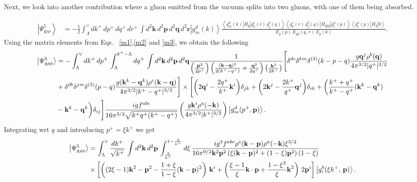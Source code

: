 \documentclass[aps,prd,amsmath,amssymb,nofootinbib]{revtex4-2}
\numberwithin{equation}{section}
\begin{document}
Next, we look into another contribution where a gluon emitted from the vacuum splits into two gluons, with one of them being absorbed.
\begin{figure}[h]
    \label{fig:7}
\end{figure}
\begin{align}\label{grhorhoabs}
\left|\Psi_{g\rho\rho}^{5}\right\rangle & = -\frac{1}{2}\int_{\Lambda}^{\vee}dk^{+}\, dp^{+}\, dq^{+}\, dr^{+}\,\int d^{2}\mathbf{k}\, d^{2}\mathbf{p}\, d^{2}\mathbf{q}\, d^{2}\mathbf{r}\left|g_{m}^{d}(k)\right\rangle \frac{\left\langle g_{m}^{d}(k)\left|H_{g}\right|g_{k}^{c}(r)\, g_{j}^{b}(q)\right\rangle \left\langle g_{k}^{c}(r)\, g_{j}^{b}(q)\left|H_{ggg}\right|g_{i}^{a}(p)\right\rangle \left\langle g_{i}^{a}(p)\left|H_{g}\right|0\right\rangle }{E_{g}(p)\, E_{gg}(q,\, r)\, E_{g}(k)}.
\end{align}
Using the matrix elements from Eqs.~ \eqref{m1},\eqref{m2} and \eqref{m3}, we obtain the following
\begin{align}\label{subsgrhorhoabs}
\left|\Psi_{g\rho\rho}^{5}\right\rangle & =-\int_{\Lambda}^{\vee}dk^{+}\,dp^{+}\,\int_{\Lambda}^{k^{+}-\Lambda}dq^{+}\,\int d^{2}\mathbf{k}\,d^{2}\mathbf{p}\,d^{2}\mathbf{q}\frac{1}{\left(\frac{\mathbf{p}^{2}}{2p^{+}}\right)\left(\frac{(\mathbf{k}-\mathbf{q})^{2}}{2(k^{+}-q^{+})}+\frac{\mathbf{q}^{2}}{2q^{+}}\right)\left(\frac{\mathbf{k}^{2}}{2k^{+}}\right)}\Bigg[\delta^{dc}\delta^{km}\delta^{(3)}(k-p-q)\frac{g\mathbf{q}^{j}\rho^{b}(\mathbf{q})}{4\pi^{3/2}|q^{+}|^{3/2}}\notag \\ & +\delta^{db}\delta^{jm}\delta^{(3)}(p-q)\frac{g(\mathbf{k}^{k}-\mathbf{q}^{k})\rho^{c}(\mathbf{k}-\mathbf{q})}{4\pi^{3/2}|k^{+}-q^{+}|^{3/2}}\Bigg]\times\Bigg[\bigg(2\mathbf{q}^{i}-\frac{2q^{+}}{k^{+}}\mathbf{k}^{i}\bigg)\delta_{jk}+\bigg(2\mathbf{k}^{j}-\frac{2k^{+}}{q^{+}}\mathbf{q}^{j}\bigg)\delta_{ik}+\bigg(\frac{k^{+}+q^{+}}{k^{+}-q^{+}}(\mathbf{k}^{k}-\mathbf{q}^{k})\notag \\ & -\mathbf{k}^{k}-\mathbf{q}^{k}\bigg)\delta_{ij}\Bigg]\frac{igf^{abc}}{16\pi^{3/2}\sqrt{k^{+}q^{+}(k^{+}-q^{+})}}\left(\frac{g\mathbf{k}^{i}\rho^{a}(-\mathbf{k})}{4\pi^{3/2}|k^{+}|^{3/2}}\right)\left|g_{m}^{d}(p^{+},\mathbf{p})\right\rangle .
\end{align}
Integrating wrt $q$ and introducing $p^{+} = \xi k^{+}$ we get
\begin{align}\label{psiff}
 \left|\Psi_{g\rho\rho}^{5}\right\rangle & =\int_{\Lambda}^{\vee}\frac{dk^{+}}{\sqrt{k^{+}}}\,\int d^{2}\mathbf{k}\, d^{2}\mathbf{p}\,\int_{\frac{\Lambda}{k^{+}}}^{1-\frac{\Lambda}{k^{+}}}d\xi\,\frac{ig^{3}f^{abc}\rho^{c}(\mathbf{k}-\mathbf{p})\rho^{a}(-\mathbf{k})\xi^{3/2}}{16\pi^{9/2}\mathbf{k}^{2}\mathbf{p}^{2}\left(\xi(\mathbf{k}-\mathbf{p})^{2}+(1-\xi)\mathbf{p}^{2}\right)(1-\xi)}\notag \\
&\times\left[\left((2\xi-1)\mathbf{k}^{2}-\mathbf{p}^{2}-\frac{1+\xi}{1-\xi}(\mathbf{k}-\mathbf{p})^{2}\right)\,\mathbf{k}^{i}+\left(\frac{\xi-1}{\xi}\mathbf{k}\cdot \mathbf{p}+\frac{1-\xi^{2}}{\xi}\mathbf{k}^{2}\right)\,2\mathbf{p}^{i}\right]\left|g_{i}^{b}(\xi k^{+},\, \mathbf{p})\right\rangle.  
\end{align}
\end{document}
